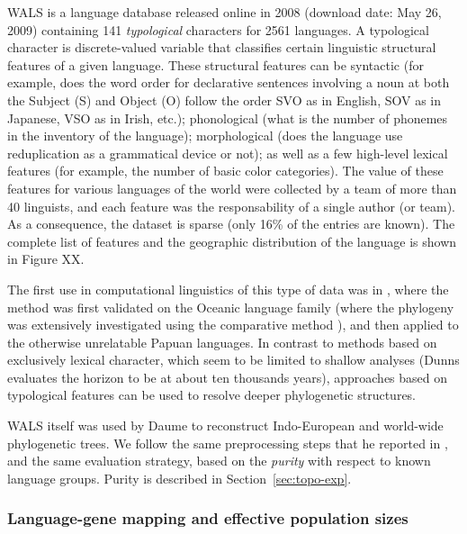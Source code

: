\documentclass {article}
\begin{document}
WALS is a language database released online in 2008 \cite{xx} (download date: May 26, 2009) containing 141 \emph{typological} characters for 2561 languages. A typological character is discrete-valued variable that classifies certain linguistic structural features of a given language.  These structural features can be syntactic (for example, does the word order for declarative sentences involving a noun at both the Subject (S) and Object (O) follow the order SVO as in English, SOV as in Japanese, VSO as in Irish, etc.); phonological (what is the number of phonemes in the inventory of the language);  morphological (does the language use reduplication as a grammatical device or not); as well as a few high-level lexical features (for example, the number of basic color categories).  The value of these features for various languages of the world were collected by a team of more than 40 linguists, and each feature was the responsability of a single author (or team).  As a consequence, the dataset is sparse (only 16\% of the entries are known).  The complete list of features and the geographic distribution of the language is shown in Figure XX.

The first use in computational linguistics of this type of data was in \cite{dunns}, where the method was first validated on the Oceanic language family (where the phylogeny was extensively investigated using the comparative method \cite{blust, pauls, etc}), and then applied to the otherwise unrelatable Papuan languages.  In contrast to methods based on exclusively lexical character, which seem to be limited to shallow analyses (Dunns evaluates the horizon to be at about ten thousands years), approaches based on typological features can be used to resolve deeper phylogenetic structures.  

WALS itself was used by Daume \cite{xx} to reconstruct Indo-European and world-wide phylogenetic trees.  We follow the same preprocessing steps that he reported in \cite{xx}, and the same evaluation strategy, based on the \emph{purity} with respect to known language groups.  Purity is described in Section~\ref{sec:topo-exp}.






\subsubsection*{Language-gene mapping and effective population sizes}
\end{document}
